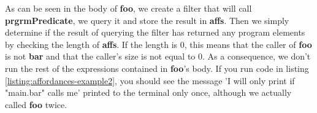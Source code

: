 \documentclass[11pt,fleqn,openany]{book} %
\begin{document}
As can be seen in the body of \textbf{foo}, we create a filter that will call \textbf{prgrmPredicate}, we query it and store the result in \textbf{affs}. Then we simply determine if the result of querying the filter has returned any program elements by checking the length of \textbf{affs}. If the length is 0, this means that the caller of \textbf{foo} is not \textbf{bar} and that the caller's size is not equal to 0. As a consequence, we don't run the rest of the expressions contained in \textbf{foo}'s body. If you run code in listing \ref{listing:affordances-example2}, you should see the message 'I will only print if "main.bar" calls me' printed to the terminal only once, although we actually called \textbf{foo} twice.



\end{document}

